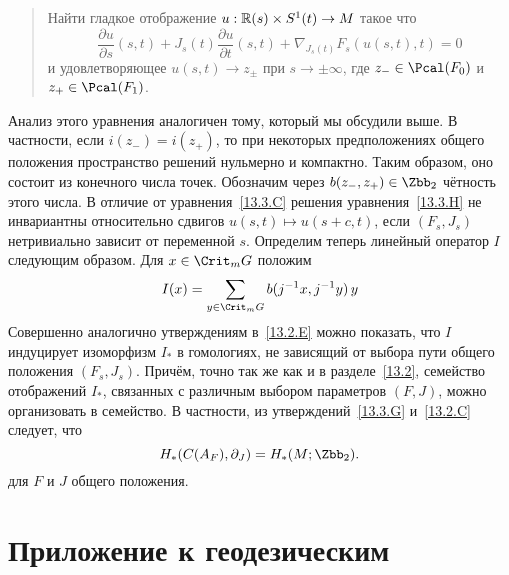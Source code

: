 \begin{quote}
  Найти гладкое отображение $u:\mathbb{R}(s)\times S^{1}(t)\to M$
  такое что 
  \begin{equation}\label{13.3.H}
    \frac{\partial u}{\partial s}(s,t)+
    J_{s}(t)\frac{\partial u}{\partial t}(s,t) +
    \nabla_{J_{s}(t)}F_{s}(u(s,t),t) = 0
  \end{equation}
  и удовлетворяющее $u(s,t)\to z_{\pm}$ при $s\to\pm\infty$, где
  $z_{-}\in\Pcal(F_{0})$ и $z_{+}\in\Pcal(F_{1})$.
\end{quote}
Анализ этого уравнения аналогичен тому, который мы обсудили выше.
В частности, если $i(z_{-})=i(z_{+})$, то при некоторых предположениях
общего положения пространство решений нульмерно и компактно. 
Таким образом, оно состоит из конечного числа точек.
Обозначим через $b(z_{-},z_{+})\in\Zbb_{2}$ чётность этого числа.
В отличие от уравнения~\ref{13.3.C} решения
уравнения~\ref{13.3.H} не инвариантны относительно сдвигов
$u(s,t)\mapsto u(s+c,t)$, если $(F_{s}, J_{s})$ нетривиально зависит
от переменной $s$.
Определим теперь линейный оператор $I$ следующим образом.
Для $x\in\Crit_{m}G$ положим
\begin{equation}
I(x) = \sum_{y\in\Crit_{m}G}b(j^{-1}x,j^{-1}y)\,y
\label{13.3.I}
\end{equation}
Совершенно аналогично утверждениям в~\ref{13.2.E} можно показать, что
$I$ индуцирует изоморфизм $I_{*}$ в гомологиях, не зависящий от выбора
пути общего положения $(F_{s}, J_{s})$. 
Причём, точно так же как и в разделе~\ref{13.2}, семейство отображений
$I_{*}$, связанных с различным выбором параметров $(F,J)$, можно
организовать в  семейство.
В частности, из утверждений~\ref{13.3.G} и~\ref{13.2.C} следует,
что 
\[
H_{*}(C(A_{F}),\partial_{J}) = H_{*}(M;\Zbb_{2}).
\]
для $F$ и $J$ общего положения.

\section{Приложение к геодезическим}\label{sec:13.4}

